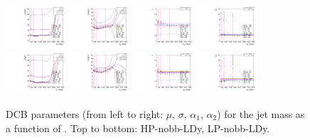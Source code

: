\begin{figure}[htbp]
  \centering
  \includegraphics[width=0.2\textwidth]{fig/2Dfit/paramSignalShape_allSig_MJJ_HP_nobb_LDy_mean.pdf}
  \includegraphics[width=0.2\textwidth]{fig/2Dfit/paramSignalShape_allSig_MJJ_HP_nobb_LDy_sigma.pdf}
  \includegraphics[width=0.2\textwidth]{fig/2Dfit/paramSignalShape_allSig_MJJ_HP_nobb_LDy_alpha.pdf}
  \includegraphics[width=0.2\textwidth]{fig/2Dfit/paramSignalShape_allSig_MJJ_HP_nobb_LDy_alpha2.pdf}\\
  \includegraphics[width=0.2\textwidth]{fig/2Dfit/paramSignalShape_allSig_MJJ_LP_nobb_LDy_mean.pdf}
  \includegraphics[width=0.2\textwidth]{fig/2Dfit/paramSignalShape_allSig_MJJ_LP_nobb_LDy_sigma.pdf}
  \includegraphics[width=0.2\textwidth]{fig/2Dfit/paramSignalShape_allSig_MJJ_LP_nobb_LDy_alpha.pdf}
  \includegraphics[width=0.2\textwidth]{fig/2Dfit/paramSignalShape_allSig_MJJ_LP_nobb_LDy_alpha2.pdf}\\
  \caption{
    DCB parameters (from left to right: $\mu$, $\sigma$, $\alpha_1$, $\alpha_2$) for the jet mass \MJ as a function of \MX.
    Top to bottom: HP-nobb-LDy, LP-nobb-LDy.
  }
  \label{fig:MJJShapeParam_LDy_Run2}
\end{figure}


